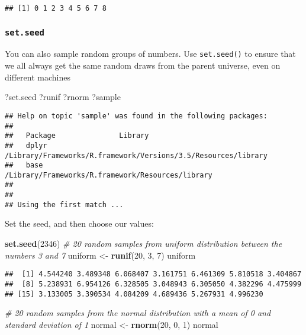 \documentclass[]{article}
\newenvironment{Shaded}{\begin{snugshade}}{\end{snugshade}}
\newcommand{\KeywordTok}[1]{\textcolor[rgb]{0.13,0.29,0.53}{\textbf{#1}}}
\newcommand{\DecValTok}[1]{\textcolor[rgb]{0.00,0.00,0.81}{#1}}
\newcommand{\StringTok}[1]{\textcolor[rgb]{0.31,0.60,0.02}{#1}}
\newcommand{\CommentTok}[1]{\textcolor[rgb]{0.56,0.35,0.01}{\textit{#1}}}
\newcommand{\NormalTok}[1]{#1}
\begin{document}
\begin{verbatim}
## [1] 0 1 2 3 4 5 6 7 8
\end{verbatim}

\subsubsection{\texorpdfstring{\texttt{set.seed}}{set.seed}}\label{set.seed}

You can also sample random groups of numbers. Use \texttt{set.seed()} to
ensure that we all always get the same random draws from the parent
universe, even on different machines

\begin{Shaded}
\begin{Highlighting}[]
\NormalTok{?set.seed}
\NormalTok{?runif}
\NormalTok{?rnorm}
\NormalTok{?sample}
\end{Highlighting}
\end{Shaded}

\begin{verbatim}
## Help on topic 'sample' was found in the following packages:
## 
##   Package               Library
##   dplyr                 /Library/Frameworks/R.framework/Versions/3.5/Resources/library
##   base                  /Library/Frameworks/R.framework/Resources/library
## 
## 
## Using the first match ...
\end{verbatim}

Set the seed, and then choose our values:

\begin{Shaded}
\begin{Highlighting}[]
\KeywordTok{set.seed}\NormalTok{(}\DecValTok{2346}\NormalTok{)}
\CommentTok{# 20 random samples from uniform distribution between the numbers 3 and 7}
\NormalTok{uniform <-}\StringTok{ }\KeywordTok{runif}\NormalTok{(}\DecValTok{20}\NormalTok{, }\DecValTok{3}\NormalTok{, }\DecValTok{7}\NormalTok{) }
\NormalTok{uniform}
\end{Highlighting}
\end{Shaded}

\begin{verbatim}
##  [1] 4.544240 3.489348 6.068407 3.161751 6.461309 5.810518 3.404867
##  [8] 5.238931 6.954126 6.328505 3.048943 6.305050 4.382296 4.475999
## [15] 3.133005 3.390534 4.084209 4.689436 5.267931 4.996230
\end{verbatim}

\begin{Shaded}
\begin{Highlighting}[]
\CommentTok{# 20 random samples from the normal distribution with a mean of 0 and standard deviation of 1}
\NormalTok{normal <-}\StringTok{ }\KeywordTok{rnorm}\NormalTok{(}\DecValTok{20}\NormalTok{, }\DecValTok{0}\NormalTok{, }\DecValTok{1}\NormalTok{) }
\NormalTok{normal}
\end{Highlighting}
\end{Shaded}
\end{document}
